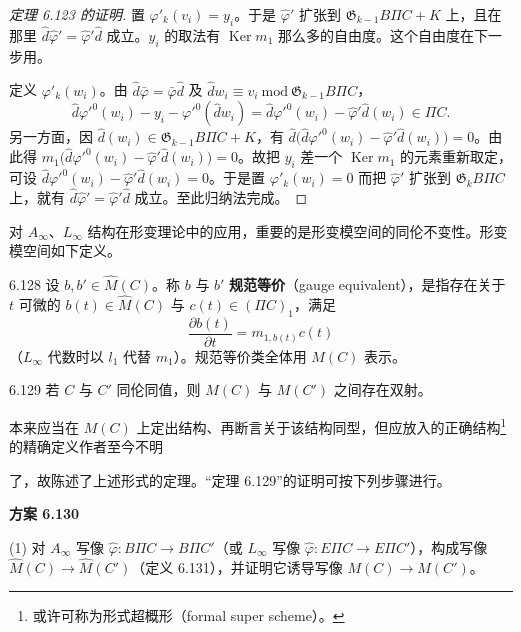 \begin{proof}[定理 6.123 的证明]
  置 $\varphi'_k(v_i)=y_i$。于是 $\hat\varphi'$ 扩张到 $\mathfrak{G}_{k-1}B\Pi C+K$ 上，且在那里 $\hat d\hat\varphi'=\hat\varphi'\hat d$ 成立。$y_i$ 的取法有 $\operatorname{Ker}m_1$ 那么多的自由度。这个自由度在下一步用。

  定义 $\varphi'_k(w_i)$。由 $\hat d\bar\varphi=\bar\varphi\hat d$ 及 $\hat dw_i\equiv v_i\ \mathrm{mod}\ \mathfrak{G}_{k-1}B\Pi C$，
  \[
    \hat d\varphi'^0(w_i)-y_i-\varphi'^0(\hat dw_i)=\hat d\varphi'^0(w_i)-\hat\varphi'\hat d(w_i)\in\Pi C.
  \]
  另一方面，因 $\hat d(w_i)\in\mathfrak{G}_{k-1}B\Pi C+K$，有 $\hat d\bigl(\hat d\varphi'^0(w_i)-\hat\varphi'\hat d(w_i)\bigr)=0$。由此得 $m_1\bigl(\hat d\varphi'^0(w_i)-\hat\varphi'\hat d(w_i)\bigr)=0$。故把 $y_i$ 差一个 $\operatorname{Ker}m_1$ 的元素重新取定，可设 $\hat d\varphi'^0(w_i)-\hat\varphi'\hat d(w_i)=0$。于是置 $\varphi'_k(w_i)=0$ 而把 $\hat\varphi'$ 扩张到 $\mathfrak{G}_kB\Pi C$ 上，就有 $\hat d\hat\varphi'=\hat\varphi'\hat d$ 成立。至此归纳法完成。
\end{proof}

对 $A_{\infty}$、$L_{\infty}$ 结构在形变理论中的应用，重要的是形变模空间的同伦不变性。形变模空间如下定义。

\begin{definition}{6.128}
  设 $b,b'\in\hat M(C)$。称 $b$ 与 $b'$ \textbf{规范等价}（gauge equivalent），是指存在关于 $t$ 可微的 $b(t)\in\hat M(C)$ 与 $c(t)\in(\Pi C)_1$，满足
  \[
    \frac{\partial b(t)}{\partial t}=m_{1,b(t)}c(t)
  \]
  （$L_{\infty}$ 代数时以 $l_1$ 代替 $m_1$）。规范等价类全体用 $M(C)$ 表示。
\end{definition}

\begin{theorem}{6.129}
  若 $C$ 与 $C'$ 同伦同值，则 $M(C)$ 与 $M(C')$ 之间存在双射。
\end{theorem}


本来应当在 $M(C)$ 上定出结构、再断言关于该结构同型，但应放入的正确结构\footnote{或许可称为形式超概形（formal super scheme）。}的精确定义作者至今不明

了，故陈述了上述形式的定理。“定理 6.129”的证明可按下列步骤进行。

\textbf{方案 6.130}

(1) 对 $A_{\infty}$ 写像 $\hat\varphi\colon B\Pi C\to B\Pi C'$（或 $L_{\infty}$ 写像 $\hat\varphi\colon E\Pi C\to E\Pi C'$），构成写像 $\hat M(C)\to\hat M(C')$（定义 6.131），并证明它诱导写像 $M(C)\to M(C')$。

